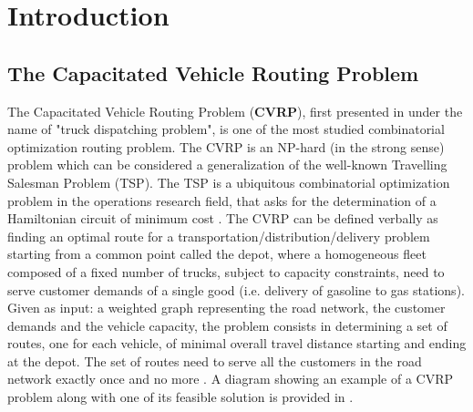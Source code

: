 \chapter{Introduction}
\label{sec:introduction-chapter}

\section{The Capacitated Vehicle Routing Problem}
\label{sec:intro-cvrp-problem}

The Capacitated Vehicle Routing Problem (\textbf{CVRP}), first presented in \textcite{dantzig1959}
under the name of "truck dispatching problem",
is one of the most studied combinatorial optimization routing problem.
The CVRP is an NP-hard (in the strong sense) problem which can be considered a generalization
of the well-known Travelling Salesman Problem (TSP).
The TSP \parencite{flood1956}
is a ubiquitous combinatorial optimization problem in the operations research field,
that asks for the determination of a Hamiltonian circuit of minimum cost
\parencite{croes1958, laporte1992,johnson1997,applegate2006,gutin2006,hoffman2013}.
The CVRP can be defined verbally as finding an optimal route for a transportation/distribution/delivery problem
starting from a common point called the depot,
where a homogeneous fleet composed of a fixed number of trucks, subject to capacity constraints,
need to serve customer demands of a single good (i.e. delivery of gasoline to gas stations).
Given as input: a weighted graph representing the road network,
the customer demands and the vehicle capacity,
the problem consists in determining a set of routes, one for each vehicle,
of minimal overall travel distance starting and ending at the depot.
The set of routes need to serve all the customers in the road network exactly once and no more
\parencite{toth2014}.
A diagram showing an example of a CVRP problem along with one of its feasible solution
is provided in .

